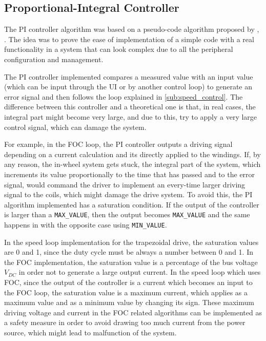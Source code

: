 \subsection{Proportional-Integral Controller}

The \ac{PI} controller algorithm was based on a pseudo-code algorithm proposed by \citeauthor{sistemi_di_controllo:2007}, \citeyear{sistemi_di_controllo:2007}. The idea was to prove the ease of implementation of a simple code with a real functionality in a system that can look complex due to all the peripheral configuration and management.



The \ac{PI} controller implemented compares a measured value with an input value (which can be input through the \ac{UI} or by another control loop) to generate an error signal and then follows the loop explained in \ref{sub:speed_control}. The difference between this controller and a theoretical one is that, in real cases, the integral part might become very large, and due to this, try to apply a very large control signal, which can damage the system.

For example, in the \ac{FOC} loop, the \ac{PI} controller outputs a driving signal depending on a current calculation and its directly applied to the windings. If, by any reason, the in-wheel system gets stuck, the integral part of the system, which increments its value proportionally to the time that has passed and to the error signal, would command the driver to implement an every-time larger driving signal to the coils, which might damage the drive system. To avoid this, the \ac{PI} algorithm implemented has a saturation condition. If the output of the controller is larger than a \texttt{MAX\_VALUE}, then the output becomes \texttt{MAX\_VALUE} and the same happens in with the opposite case using \texttt{MIN\_VALUE}. 

In the speed loop implementation for the trapezoidal drive, the saturation values are 0 and 1, since the duty cycle must be always a number between 0 and 1. In the \ac{FOC} implementation, the saturation value is a percentage of the bus voltage $V_{DC}$ in order not to generate a large output current. In the speed loop which uses \ac{FOC}, since the output of the controller is a current which becomes an input to the \ac{FOC} loop, the saturation value is a maximum current, which applies as a maximum value and as a minimum value by changing its sign. These maximum driving voltage and current in the \ac{FOC} related algorithms can be implemented as a safety measure in order to avoid drawing too much current from the power source, which might lead to malfunction of the system.

